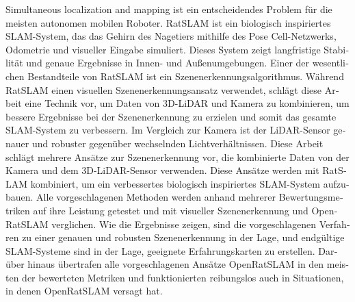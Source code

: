\begin{otherlanguage}{ngerman}

    Simultaneous localization and mapping ist ein entscheidendes Problem für die meisten autonomen mobilen Roboter. RatSLAM ist ein biologisch inspiriertes SLAM-System, das das Gehirn des Nagetiers mithilfe des Pose Cell-Netzwerks, Odometrie und visueller Eingabe simuliert. Dieses System zeigt langfristige Stabilität und genaue Ergebnisse in Innen- und Außenumgebungen. Einer der wesentlichen Bestandteile von RatSLAM ist ein Szenenerkennungsalgorithmus. Während RatSLAM einen visuellen Szenenerkennungsansatz verwendet, schlägt diese Arbeit eine Technik vor, um Daten von 3D-LiDAR und Kamera zu kombinieren, um bessere Ergebnisse bei der Szenenerkennung zu erzielen und somit das gesamte SLAM-System zu verbessern. Im Vergleich zur Kamera ist der LiDAR-Sensor genauer und robuster gegenüber wechselnden Lichtverhältnissen. Diese Arbeit schlägt mehrere Ansätze zur Szenenerkennung vor, die kombinierte Daten von der Kamera und dem 3D-LiDAR-Sensor verwenden. Diese Ansätze werden mit RatSLAM kombiniert, um ein verbessertes biologisch inspiriertes SLAM-System aufzubauen. Alle vorgeschlagenen Methoden werden anhand mehrerer Bewertungsmetriken auf ihre Leistung getestet und mit visueller Szenenerkennung und OpenRatSLAM verglichen. Wie die Ergebnisse zeigen, sind die vorgeschlagenen Verfahren zu einer genauen und robusten Szenenerkennung in der Lage, und endgültige SLAM-Systeme sind in der Lage, geeignete Erfahrungskarten zu erstellen. Darüber hinaus übertrafen alle vorgeschlagenen Ansätze OpenRatSLAM in den meisten der bewerteten Metriken und funktionierten reibungslos auch in Situationen, in denen OpenRatSLAM versagt hat.

\end{otherlanguage}


\makeatletter
{}
{\renewcommand{\abstractname}{Abstract}}
{\renewcommand{\abstractname}{Kurzfassung}}
\makeatother